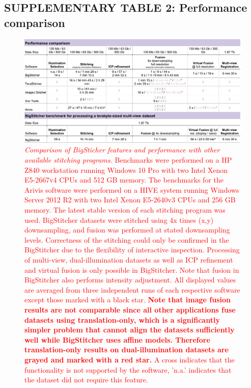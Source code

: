 \documentclass[]{spie}  %
\def\red{\textcolor{red}}
\begin{document}
\begin{landscape}
\subsection*{SUPPLEMENTARY TABLE 2: Performance comparison}
\begin{figure}[h!]
\center\includegraphics[width=\textwidth+5.00cm]{supp_table_1.pdf}
\vspace{0.5mm}
\caption{\hspace{-0.5mm} \red{\emph{Comparison of BigSticher features and performance with other available stitching programs.} Benchmarks were performed on a HP Z840 workstation running Windows 10 Pro with two Intel Xenon E5-2667v4 CPUs and 512 GB memory. The benchmarks for the Arivis software were performed on a HIVE system running Windows Server 2012 R2 with two Intel Xenon E5-2640v3 CPUs and 256 GB memory. The latest stable version of each stitching program was used. BigStitcher datasets were stitched using 4x times (x,y) downsampling, and fusion was performed at stated downsampling levels. Correctness of the stitching could only be confirmed in the BigStitcher due to the flexibility of interactive inspection. Processing of multi-view, dual-illumination datasets as well as ICP refinement and virtual fusion is only possible in BigStitcher. Note that fusion in BigStitcher also performs intensity adjustment. All displayed values are averaged from three independent runs of each respective software except those marked with a black star. \textbf{Note that image fusion results are not comparable since all other applications fuse datasets using translation-only, which is a significantly simpler problem that cannot align the datasets sufficiently well while BigStitcher uses affine models. Therefore translation-only results on dual-illumination datasets are grayed and marked with a red star.} A cross indicates that the functionality is not supported by the software, 'n.a.' indicates that the dataset did not require this feature.}
}
\label{tab:benchmarks}
\end{figure}

\end{landscape}
\pagebreak
\end{document}
